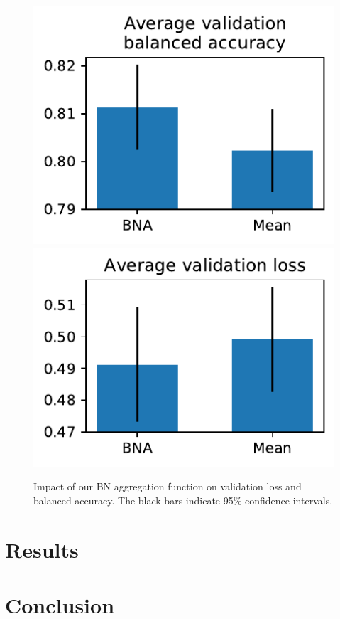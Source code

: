 \documentclass[final]{cvpr}
\begin{document}
\begin{figure}[t]
	\begin{center}
		\includegraphics[width=0.47\linewidth]{agg_bal_acc.pdf}
		\includegraphics[width=0.47\linewidth]{agg_val_loss.pdf}
	\end{center}
	\caption{Impact of our BN aggregation function on validation loss and balanced accuracy.  The black bars indicate 95\% confidence intervals.}
	\label{fig:resnet}
\end{figure}
	
	\section{Results}
	
	\section{Conclusion}
	
	
	{\small
		
		
	}
\end{document}
